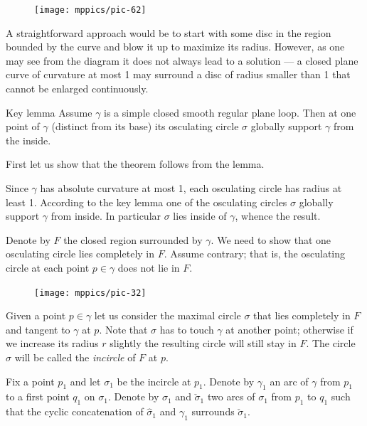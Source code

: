 \begin{figure}
\vskip-0mm
\centering
\texttt{[image: mppics/pic-62]}
\vskip0mm
\end{figure}

A straightforward approach would be to start with some disc in the region bounded by the curve and blow it up to maximize its radius.
However, as one may see from the diagram it does not always lead to a solution --- a closed plane curve of curvature at most 1 may surround a disc of radius smaller than 1 that cannot be enlarged continuously.


\begin{thm}{Key lemma}\label{thm:moon}
Assume $\gamma$ is a simple closed smooth regular plane loop.
Then at one point of $\gamma$ (distinct from its base) its osculating circle $\sigma$ globally support $\gamma$ from the inside.
\end{thm}

First let us show that the theorem follows from the lemma.

Since $\gamma$ has absolute curvature at most 1, each osculating circle has radius at least 1.
According to the key lemma one of the osculating circles $\sigma$ globally support $\gamma$ from inside.
In particular $\sigma$ lies inside of $\gamma$, whence the result.
\qeds

Denote by $F$ the closed region surrounded by $\gamma$.
We need to show that one osculating circle lies completely in $F$.
Assume contrary; that is, the osculating circle at each point $p\in \gamma$ does not lie in $F$.

\begin{figure}[h!]%
\vskip-0mm
\centering
\texttt{[image: mppics/pic-32]}
\vskip0mm
\end{figure}

Given a point $p\in\gamma$ let us consider the maximal circle $\sigma$ that lies completely in $F$ and tangent to $\gamma$ at $p$.
Note that $\sigma$ has to touch $\gamma$ at another point;
otherwise if we increase its radius $r$ slightly the resulting circle will still stay in $F$.
The circle $\sigma$ will be called the \emph{incircle} of $F$ at $p$.


Fix a point $p_1$ and let $\sigma_1$ be the incircle at $p_1$.
Denote by $\gamma_1$ an arc of $\gamma$ from $p_1$ to a first point $q_1$ on $\sigma_1$.
Denote by $\hat\sigma_1$ and $\check\sigma_1$ two arcs of $\sigma_1$ from $p_1$ to $q_1$ such that the cyclic concatenation of $\hat\sigma_1$ and $\gamma_1$ surrounds $\check\sigma_1$.

